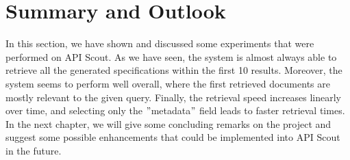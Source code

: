 \section{Summary and Outlook}\label{sec:summary-and-outlook-1}
In this section, we have shown and discussed some experiments that were performed on API Scout.
As we have seen, the system is almost always able to retrieve all the generated specifications within the first 10 results.
Moreover, the system seems to perform well overall, where the first retrieved documents are mostly relevant to the given query.
Finally, the retrieval speed increases linearly over time, and selecting only the \("\)metadata\("\) field leads to faster retrieval times.
In the next chapter, we will give some concluding remarks on the project and suggest some possible enhancements that could be implemented into API Scout in the future.
